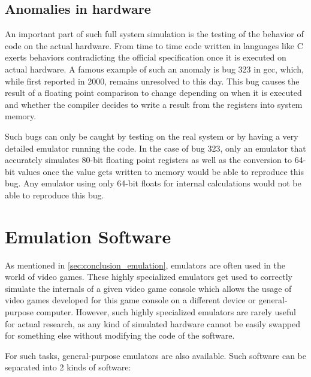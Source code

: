 \subsection{Anomalies in hardware}
An important part of such full system simulation is the testing of the behavior of code on the actual hardware.
From time to time code written in languages like C exerts behaviors contradicting the official specification
once it is executed on actual hardware.
A famous example of such an anomaly is bug 323\cite{323} in gcc,
which, while first reported in 2000, remains unresolved to this day.
This bug causes the result of a floating point comparison to change depending on when it is executed
and whether the compiler decides to write a result from the registers into system memory.

Such bugs can only be caught by testing on the real system
or by having a very detailed emulator running the code.
In the case of bug 323, only an emulator that accurately simulates 80-bit floating point registers
as well as the conversion to 64-bit values once the value gets written to memory
would be able to reproduce this bug.
Any emulator using only 64-bit floats for internal calculations would not be able to reproduce this bug.

\section{Emulation Software}\label{sec:emulators}
As mentioned in \autoref{sec:conclusion_emulation}, emulators are often used in the world of video games.
These highly specialized emulators get used to correctly simulate the internals of a given video game console
which allows the usage of video games developed for this game console on a different device or general-purpose computer.
However, such highly specialized emulators are rarely useful for actual research,
as any kind of simulated hardware cannot be easily swapped for something else without modifying the code of the software.

For such tasks, general-purpose emulators are also available.
Such software can be separated into 2 kinds of software:

